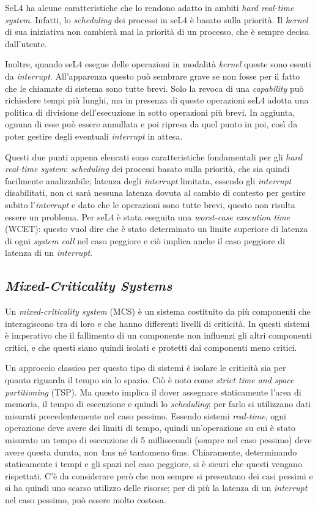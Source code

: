 SeL4 ha alcune caratteristiche che lo rendono adatto in ambiti \textit{hard real-time system}. Infatti, lo \textit{scheduling} dei processi in seL4 è basato sulla priorità. Il \textit{kernel} di sua iniziativa non cambierà mai la priorità di un processo, che è sempre decisa dall'utente.

Inoltre, quando seL4 esegue delle operazioni in modalità \textit{kernel} queste sono esenti da \textit{interrupt}. All'apparenza questo può sembrare grave se non fosse per il fatto che le chiamate di sistema sono tutte brevi. Solo la revoca di una \textit{capability} può richiedere tempi più lunghi, ma in presenza di queste operazioni seL4 adotta una politica di divisione dell'esecuzione in sotto operazioni più brevi. In aggiunta, ognuna di esse può essere annullata e poi ripresa da quel punto in poi, così da poter gestire degli eventuali \textit{interrupt} in attesa.

Questi due punti appena elencati sono caratteristiche fondamentali per gli \textit{hard real-time system}: \textit{scheduling} dei processi basato sulla priorità, che sia quindi facilmente analizzabile; latenza degli \textit{interrupt} limitata, essendo gli \textit{interrupt} disabilitati, non ci sarà nessuna latenza dovuta al cambio di contesto per gestire subito l'\textit{interrupt} e dato che le operazioni sono tutte brevi, questo non risulta essere un problema.
Per seL4 è stata eseguita una \textit{worst-case execution time} (WCET): questo vuol dire che è stato determinato un limite superiore di latenza di ogni \textit{system call} nel caso peggiore e ciò implica anche il caso peggiore di latenza di un \textit{interrupt}.

\subsection{\textit{Mixed-Criticality Systems}}
Un \textit{mixed-criticality system} (MCS) è un sistema costituito da più componenti che interagiscono tra di loro e che hanno differenti livelli di criticità. In questi sistemi è imperativo che il fallimento di un componente non influenzi gli altri componenti critici, e che questi siano quindi isolati e protetti dai componenti meno critici.

Un approccio classico per questo tipo di sistemi è isolare le criticità sia per quanto riguarda il tempo sia lo spazio. Ciò è noto come \textit{strict time and space partitioning} (TSP). Ma questo implica il dover assegnare staticamente l'area di memoria, il tempo di esecuzione e quindi lo \textit{scheduling}; per farlo si utilizzano dati misurati precedentemente nel caso pessimo. Essendo sistemi \textit{real-time}, ogni operazione deve avere dei limiti di tempo, quindi un'operazione su cui è stato misurato un tempo di esecuzione di 5 millisecondi (sempre nel caso pessimo) deve avere questa durata, non 4ms né tantomeno 6ms. Chiaramente, determinando staticamente i tempi e gli spazi nel caso peggiore, si è sicuri che questi vengano rispettati. C'è da considerare però che non sempre si presentano dei casi pessimi e si ha quindi uno scarso utilizzo delle risorse; per di più la latenza di un \textit{interrupt} nel caso pessimo, può essere molto costosa.

